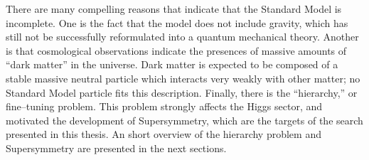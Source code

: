 There are many compelling reasons that indicate
that the Standard Model is incomplete.  One is the fact that the model does not
include gravity, which has still not be successfully reformulated into a quantum
mechanical theory.  Another is that cosmological observations indicate the
presences of massive amounts of ``dark matter'' in the universe.  Dark matter is
expected to be composed of a stable massive neutral particle which interacts
very weakly with other matter; no Standard Model particle fits this description.
Finally, there is the ``hierarchy,'' or fine--tuning problem.  This problem
strongly affects the Higgs sector, and motivated the development of
Supersymmetry, which are the targets of the search presented in this thesis.  An
short overview of the hierarchy problem and Supersymmetry are presented in the
next sections.


